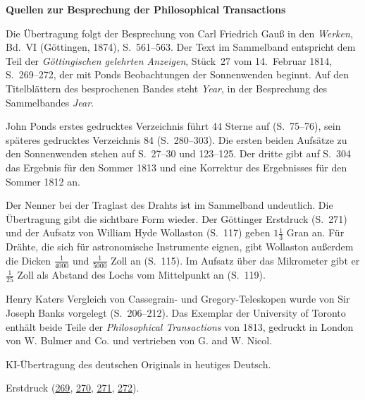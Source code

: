 \clearpage\thispagestyle{empty}
\begin{center}\Large\bfseries Quellen zur Besprechung der Philosophical Transactions\end{center}

Die Übertragung folgt der Besprechung von Carl Friedrich Gauß in den \emph{Werken}, Bd.~VI (Göttingen, 1874), S.~561--563. Der Text im Sammelband entspricht dem Teil der \emph{Göttingischen gelehrten Anzeigen}, Stück~27 vom 14.~Februar 1814, S.~269--272, der mit Ponds Beobachtungen der Sonnenwenden beginnt. Auf den Titelblättern des besprochenen Bandes steht \emph{Year}, in der Besprechung des Sammelbandes \emph{Jear}.

John Ponds erstes gedrucktes Verzeichnis führt 44 Sterne auf (S.~75--76), sein späteres gedrucktes Verzeichnis 84 (S.~280--303). Die ersten beiden Aufsätze zu den Sonnenwenden stehen auf S.~27--30 und 123--125. Der dritte gibt auf S.~304 das Ergebnis für den Sommer 1813 und eine Korrektur des Ergebnisses für den Sommer 1812 an.

Der Nenner bei der Traglast des Drahts ist im Sammelband undeutlich. Die Übertragung gibt die sichtbare Form wieder. Der Göttinger Erstdruck (S.~271) und der Aufsatz von William Hyde Wollaston (S.~117) geben $1\frac{1}{3}$ Gran an. Für Drähte, die sich für astronomische Instrumente eignen, gibt Wollaston außerdem die Dicken $\frac{1}{4000}$ und $\frac{1}{5000}$ Zoll an (S.~115). Im Aufsatz über das Mikrometer gibt er $\frac{1}{25}$ Zoll als Abstand des Lochs vom Mittelpunkt an (S.~119).

Henry Katers Vergleich von Cassegrain- und Gregory-Teleskopen wurde von Sir Joseph Banks vorgelegt (S.~206--212). Das Exemplar der University of Toronto enthält beide Teile der \emph{Philosophical Transactions} von 1813, gedruckt in London von W. Bulmer and Co. und vertrieben von G. and W. Nicol.

KI-Übertragung des deutschen Originals in heutiges Deutsch.

Erstdruck (\href{https://images.p.sub.uni-goettingen.de/iiif/image/gdz:PPN319721507_1814:00000271/full/1650,/0/default.jpg}{269}, \href{https://images.p.sub.uni-goettingen.de/iiif/image/gdz:PPN319721507_1814:00000272/full/1650,/0/default.jpg}{270}, \href{https://images.p.sub.uni-goettingen.de/iiif/image/gdz:PPN319721507_1814:00000273/full/1650,/0/default.jpg}{271}, \href{https://images.p.sub.uni-goettingen.de/iiif/image/gdz:PPN319721507_1814:00000274/full/1650,/0/default.jpg}{272}).

